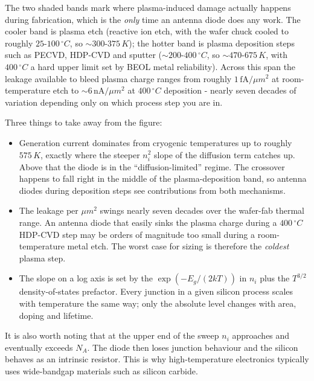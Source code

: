 The two shaded bands mark where plasma-induced damage actually happens
during fabrication, which is the \emph{only} time an antenna diode does
any work. The cooler band is plasma etch (reactive ion etch, with the
wafer chuck cooled to roughly \(25\)-\(100\, ^\circ C\), so
\(\sim 300\)-\(375\, K\)); the hotter band is plasma deposition steps
such as PECVD, HDP-CVD and sputter (\(\sim 200\)-\(400\,
^\circ C\), so \(\sim 470\)-\(675\, K\), with \(400\, ^\circ C\) a hard
upper limit set by BEOL metal reliability). Across this span the leakage
available to bleed plasma charge ranges from roughly
\(1\, \mathrm{fA}/\mu m^2\) at room-temperature etch to
\(\sim 6\, \mathrm{nA}/\mu m^2\) at \(400\, ^\circ C\) deposition -
nearly seven decades of variation depending only on which process step
you are in.

Three things to take away from the figure:

\begin{itemize}
\tightlist
\item
  Generation current dominates from cryogenic temperatures up to roughly
  \(575\, K\), exactly where the steeper \(n_i^2\) slope of the
  diffusion term catches up. Above that the diode is in the
  ``diffusion-limited'' regime. The crossover happens to fall right in
  the middle of the plasma-deposition band, so antenna diodes during
  deposition steps see contributions from both mechanisms.
\item
  The leakage per \(\mu m^2\) swings nearly seven decades over the
  wafer-fab thermal range. An antenna diode that easily sinks the plasma
  charge during a \(400\, ^\circ C\) HDP-CVD step may be orders of
  magnitude too small during a room-temperature metal etch. The worst
  case for sizing is therefore the \emph{coldest} plasma step.
\item
  The slope on a log axis is set by the \(\exp(-E_g/(2kT))\) in \(n_i\)
  plus the \(T^{3/2}\) density-of-states prefactor. Every junction in a
  given silicon process scales with temperature the same way; only the
  absolute level changes with area, doping and lifetime.
\end{itemize}

It is also worth noting that at the upper end of the sweep \(n_i\)
approaches and eventually exceeds \(N_A\). The diode then loses junction
behaviour and the silicon behaves as an intrinsic resistor. This is why
high-temperature electronics typically uses wide-bandgap materials such
as silicon carbide.


{
\centering
{}
}

